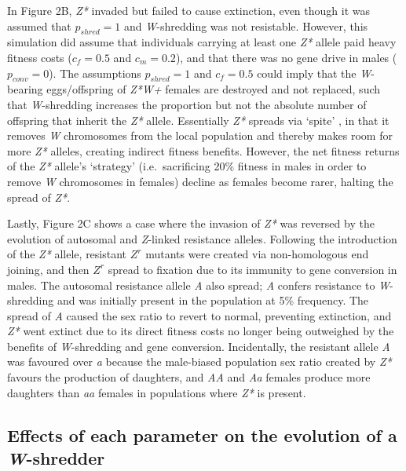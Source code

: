 \documentclass[]{rsos}%
\begin{document}
In Figure 2B, \emph{Z*} invaded but failed to cause extinction, even
though it was assumed that \(p_{shred} = 1\) and \emph{W}-shredding was
not resistable. However, this simulation did assume that individuals
carrying at least one \emph{Z*} allele paid heavy fitness costs
(\(c_f = 0.5\) and \(c_m = 0.2\)), and that there was no gene drive in
males (\(p_{conv} = 0\)). The assumptions \(p_{shred} = 1\) and
\(c_f = 0.5\) could imply that the \emph{W}-bearing eggs/offspring of
\emph{Z*W+} females are destroyed and not replaced, such that
\emph{W}-shredding increases the proportion but not the absolute number
of offspring that inherit the \emph{Z*} allele. Essentially \emph{Z*}
spreads via `spite' \citep{gardner2006sp}, in that it removes \emph{W}
chromosomes from the local population and thereby makes room for more
\emph{Z*} alleles, creating indirect fitness benefits. However, the net
fitness returns of the \emph{Z*} allele's `strategy' (i.e.~sacrificing
20\% fitness in males in order to remove \emph{W} chromosomes in
females) decline as females become rarer, halting the spread of
\emph{Z*}.

Lastly, Figure 2C shows a case where the invasion of \emph{Z*} was
reversed by the evolution of autosomal and \emph{Z}-linked resistance
alleles. Following the introduction of the \emph{Z*} allele, resistant
\(Z^r\) mutants were created via non-homologous end joining, and then
\(Z^r\) spread to fixation due to its immunity to gene conversion in
males. The autosomal resistance allele \emph{A} also spread; \emph{A}
confers resistance to \emph{W}-shredding and was initially present in
the population at 5\% frequency. The spread of \emph{A} caused the sex
ratio to revert to normal, preventing extinction, and \emph{Z*} went
extinct due to its direct fitness costs no longer being outweighed by
the benefits of \emph{W}-shredding and gene conversion. Incidentally,
the resistant allele \emph{A} was favoured over \emph{a} because the
male-biased population sex ratio created by \emph{Z*} favours the
production of daughters, and \emph{AA} and \emph{Aa} females produce
more daughters than \emph{aa} females in populations where \emph{Z*} is
present.

\hypertarget{effects-of-each-parameter-on-the-evolution-of-a-w-shredder}{%
\subsection{\texorpdfstring{Effects of each parameter on the evolution
of a
\emph{W}-shredder}{Effects of each parameter on the evolution of a W-shredder}}\label{effects-of-each-parameter-on-the-evolution-of-a-w-shredder}}
\end{document}
